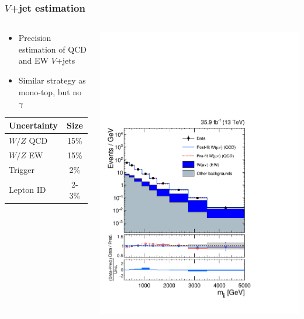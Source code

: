 \documentclass[aspectratio=169,xcolor=dvipsnames,,table,compress]{beamer}
\begin{document}
\begin{frame} \frametitle{$V$+jet estimation}
  \vspace{-5mm}
  \begin{columns}
    \begin{column}{0.33\textwidth}
      \begin{itemize}
        \item Precision estimation of QCD and EW $V$+jets
        \item Similar strategy as mono-top, but no $\gamma$
      \end{itemize}
      \vspace{2mm}
      \centering
      \begin{tabular}{l|c}
        Uncertainty & Size \\
        \hline \hline
        $W/Z$ QCD & 15\% \\
        $W/Z$ EW & 15\% \\
        \hline
        Trigger & 2\% \\
        Lepton ID & 2-3\% \\
      \end{tabular}
    \end{column}
    \begin{column}{0.33\textwidth}
      \centering
      \includegraphics[width=\textwidth]{../figures/vbf/fits/vbf_PULLS_prefit_postfit_singlemuon.pdf}

\end{column}
\end{columns}
\end{frame}
\end{document}
